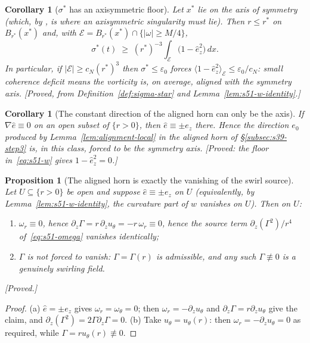 \documentclass[11pt]{article}
\newtheorem{proposition}[theorem]{Proposition}
\newtheorem{corollary}[theorem]{Corollary}
\theoremstyle{definition}
\theoremstyle{remark}
\newcommand{\eps}{\varepsilon}
\begin{document}
\begin{corollary}[$\sigma^*$ has an axisymmetric floor]\label{cor:s51-floor}
  Let $x^*$ lie on the axis of symmetry (which, by \cite{CKN1982}, is where
  an axisymmetric singularity must lie). Then $r\leq r^*$ on
  $B_{r^*}(x^*)$ and, with $\mathcal{E}=B_{r^*}(x^*)\cap\{|\omega|\geq M/4\}$,
  \[
    \sigma^*(t)
    \;\geq\; (r^*)^{-3}\int_{\mathcal{E}}\bigl(1-\hat e_z^2\bigr)\,dx .
  \]
  In particular, if $|\mathcal{E}|\geq c_N(r^*)^3$ then
  $\sigma^*\leq\eps_0$ forces
  $\bigl\langle 1-\hat e_z^2\bigr\rangle_{\mathcal{E}}\leq\eps_0/c_N$:
  \emph{small coherence deficit means the vorticity is, on average, aligned
  with the symmetry axis.} \emph{[Proved, from
  Definition~\ref{def:sigma-star} and Lemma~\ref{lem:s51-w-identity}.]}
\end{corollary}

\begin{corollary}[The constant direction of the aligned horn can only be the
  axis]\label{cor:s51-e0}
  If $\nabla\hat e\equiv0$ on an open subset of $\{r>0\}$, then
  $\hat e\equiv\pm e_z$ there. Hence the direction $e_0$ produced by
  Lemma~\ref{lem:alignment-local} in the aligned horn of
  \S\ref{subsec:s39-step3} is, in this class, forced to be the symmetry axis.
  \emph{[Proved: the floor in~\eqref{eq:s51-w} gives $1-\hat e_z^2=0$.]}
\end{corollary}

\begin{proposition}[The aligned horn is exactly the vanishing of the swirl
  source]\label{prop:s51-aligned}
  Let $U\subseteq\{r>0\}$ be open and suppose $\hat e\equiv\pm e_z$ on $U$
  (equivalently, by Lemma~\ref{lem:s51-w-identity}, the curvature part of $w$
  vanishes on $U$). Then on $U$:
  \begin{enumerate}[label=\textup{(\alph*)},leftmargin=2.4em]
  \item $\omega_r\equiv0$, hence $\partial_z\Gamma=r\,\partial_zu_\theta
    =-r\,\omega_r\equiv0$, hence the source term
    $\partial_z(\Gamma^2)/r^4$ of~\eqref{eq:s51-omega} vanishes identically;
  \item $\Gamma$ is \emph{not} forced to vanish: $\Gamma=\Gamma(r)$ is
    admissible, and any such $\Gamma\not\equiv0$ is a genuinely swirling
    field.
  \end{enumerate}
  \emph{[Proved.]}
\end{proposition}
\begin{proof}
  (a) $\hat e=\pm e_z$ gives $\omega_r=\omega_\theta=0$; then
  $\omega_r=-\partial_zu_\theta$ and $\partial_z\Gamma=r\partial_zu_\theta$
  give the claim, and $\partial_z(\Gamma^2)=2\Gamma\partial_z\Gamma=0$.
  (b) Take $u_\theta=u_\theta(r)$: then $\omega_r=-\partial_zu_\theta=0$ as
  required, while $\Gamma=ru_\theta(r)\not\equiv0$.
\end{proof}
\end{document}
